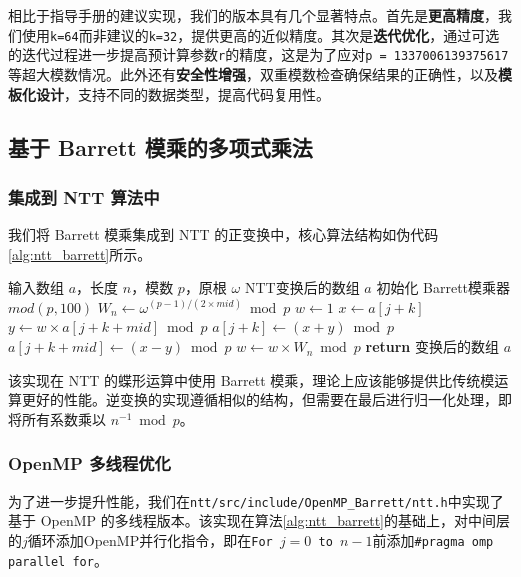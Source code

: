 \documentclass[a4paper]{article}
\begin{document}
相比于指导手册的建议实现，我们的版本具有几个显著特点。首先是\textbf{更高精度}，我们使用\texttt{k=64}而非建议的\texttt{k=32}，提供更高的近似精度。其次是\textbf{迭代优化}，通过可选的迭代过程进一步提高预计算参数\texttt{r}的精度，这是为了应对\texttt{p = 1337006139375617}等超大模数情况。此外还有\textbf{安全性增强}，双重模数检查确保结果的正确性，以及\textbf{模板化设计}，支持不同的数据类型，提高代码复用性。

\subsection{基于 Barrett 模乘的多项式乘法}

\subsubsection{集成到 NTT 算法中}

我们将 Barrett 模乘集成到 NTT 的正变换中，核心算法结构如伪代码\ref{alg:ntt_barrett}所示。

\begin{algorithm}[htbp]
\caption{基于Barrett模乘的NTT正变换}
\label{alg:ntt_barrett}
\begin{algorithmic}[1]
\Require 输入数组 $a$，长度 $n$，模数 $p$，原根 $\omega$
\Ensure NTT变换后的数组 $a$
\State 初始化 Barrett模乘器 $mod(p, 100)$
    \State $W_n \gets \omega^{(p-1)/(2 \times mid)} \bmod p$
        \State $w \gets 1$
            \State $x \gets a[j+k]$
            \State $y \gets w \times a[j+k+mid] \bmod p$ 
            \State $a[j+k] \gets (x + y) \bmod p$
            \State $a[j+k+mid] \gets (x - y) \bmod p$
            \State $w \gets w \times W_n \bmod p$ 
        \EndFor
    \EndFor
\EndFor
\State \textbf{return} 变换后的数组 $a$
\end{algorithmic}
\end{algorithm}

该实现在 NTT 的蝶形运算中使用 Barrett 模乘，理论上应该能够提供比传统模运算更好的性能。逆变换的实现遵循相似的结构，但需要在最后进行归一化处理，即将所有系数乘以 $n^{-1} \bmod p$。

\subsubsection{OpenMP 多线程优化}

为了进一步提升性能，我们在\texttt{ntt/src/include/OpenMP\_Barrett/ntt.h}中实现了基于 OpenMP 的多线程版本。该实现在算法\ref{alg:ntt_barrett}的基础上，对中间层的$j$循环添加OpenMP并行化指令，即在\texttt{For $j = 0$ to $n-1$}前添加\texttt{\#pragma omp parallel for}。
\end{document}
